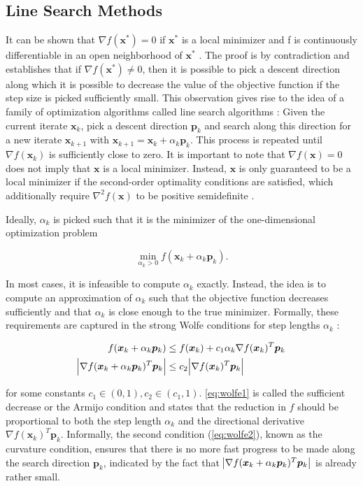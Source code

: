 \subsection{Line Search Methods}\label{ss:line-search}
It can be shown that $\nabla f(\bm{x}^*) = 0$ if $\bm{x}^*$ is a local minimizer and f is continuously differentiable in an open neighborhood
of $\bm{x}^*$ \cite{nocedal2006}. The proof is by contradiction and establishes that if $\nabla f(\bm{x}^*) \neq 0$, then it is possible to pick a descent 
direction along which it is possible to decrease the value of the objective function if the step size is picked sufficiently small. This 
observation gives rise to the idea of a family of optimization algorithms called line search algorithms \cite{nocedal2006}: Given the current 
iterate $\bm{x}_k$, pick a descent direction $\bm{p}_k$ and search along this direction for a new iterate $\bm{x}_{k+1}$ with $\bm{x}_{k+1} = 
\bm{x}_k + \alpha_k \bm{p}_k$. This process is repeated until $\nabla f(\bm{x}_k)$ is sufficiently close to zero. It is important to note that 
$\nabla f(\bm{x}) = 0$ does not imply that $\bm{x}$ is a local minimizer. Instead, $\bm{x}$ is only guaranteed to be a local minimizer if 
the second-order 
optimality conditions are satisfied, which additionally require $\nabla^2 f(\bm{x})$ to be positive semidefinite \cite{nocedal2006}.

Ideally, $\alpha_k$ is picked such that it is the minimizer of the one-dimensional optimization problem

\[
    \min_{\alpha_k > 0} f(\bm{x}_k + \alpha_k \bm{p}_k).
\]

\noindent In most cases, it is infeasible to compute $\alpha_k$ exactly. Instead, the idea is to compute an approximation of $\alpha_k$ such that 
the objective function decreases sufficiently and that $\alpha_k$ is close enough to the true minimizer. Formally, these requirements
are captured in the strong Wolfe conditions for step lengths $\alpha_k$ \cite{nocedal2006}:

\begin{align}
    f(\bm{x}_k + \alpha_k \bm{p}_k) &\leq f(\bm{x}_k) + c_1 \alpha_k \nabla f(\bm{x}_k)^T \bm{p}_k \label{eq:wolfe1} \\
    \abs{\nabla f(\bm{x}_k + \alpha_k \bm{p}_k)^T \bm{p}_k} &\leq c_2 \abs{\nabla f(\bm{x}_k)^T \bm{p}_k} \label{eq:wolfe2}
\end{align}

\noindent for some constants $c_1 \in (0, 1), c_2 \in (c_1, 1)$. \cref{eq:wolfe1} is called the sufficient decrease or the Armijo condition 
and states that the reduction in $f$ should be proportional to both the step length $\alpha_k$ and the directional derivative 
$\nabla f(\bm{x}_k)^T \bm{p}_k$. Informally, the second condition (\cref{eq:wolfe2}), known as the curvature condition, ensures that there 
is no more fast 
progress to be made along the search direction $\bm{p}_k$, indicated by the fact that $\abs{\nabla f(\bm{x}_k + \alpha_k \bm{p}_k)^T
\bm{p}_k}$ is already rather small. 

